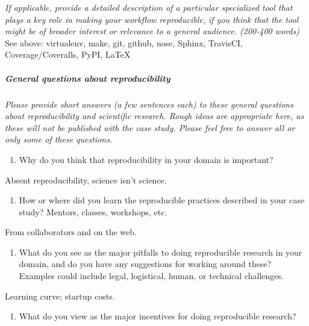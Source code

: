 \documentclass[]{article}
\begin{document}
\emph{If applicable, provide a detailed description of a particular
specialized tool that plays a key role in making your workflow
reproducible, if you think that the tool might be of broader interest or
relevance to a general audience. (200-400 words)} See above: virtualenv,
make, git, github, nose, Sphinx, TravisCI, Coverage/Coveralls, PyPI,
LaTeX

\subparagraph{General questions about
reproducibility}\label{general-questions-about-reproducibility}

\emph{Please provide short answers (a few sentences each) to these
general questions about reproducibility and scientific research. Rough
ideas are appropriate here, as these will not be published with the case
study. Please feel free to answer all or only some of these questions.}

\begin{enumerate}
\def\labelenumi{\arabic{enumi})}
\itemsep1pt\parskip0pt
\item
  Why do you think that reproducibility in your domain is important?
\end{enumerate}

Absent reproducibility, science isn't science.

\begin{enumerate}
\def\labelenumi{\arabic{enumi})}
\setcounter{enumi}{1}
\itemsep1pt\parskip0pt
\item
  How or where did you learn the reproducible practices described in
  your case study? Mentors, classes, workshops, etc.
\end{enumerate}

From collaborators and on the web.

\begin{enumerate}
\def\labelenumi{\arabic{enumi})}
\setcounter{enumi}{2}
\itemsep1pt\parskip0pt
\item
  What do you see as the major pitfalls to doing reproducible research
  in your domain, and do you have any suggestions for working around
  these? Examples could include legal, logistical, human, or technical
  challenges.
\end{enumerate}

Learning curve; startup costs.

\begin{enumerate}
\def\labelenumi{\arabic{enumi})}
\setcounter{enumi}{3}
\itemsep1pt\parskip0pt
\item
  What do you view as the major incentives for doing reproducible
  research?
\end{enumerate}
\end{document}
